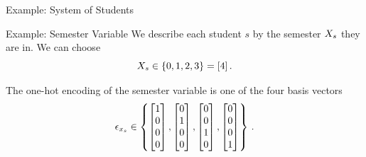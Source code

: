 \documentclass{beamer}
\begin{document}
    \begin{frame}{Example: System of Students}

        \begin{block}{Example: Semester Variable}
            We describe each student $s$ by the semester $X_{s}$ they are in.
            We can choose
            \[ X_{s} \in \{0,1,2,3\} = [4] \, . \]
        \end{block}

        The one-hot encoding of the semester variable is one of the four basis vectors
        \begin{align}
            \epsilon_{x_{s}} \in \left\{
                                                 \begin{bmatrix}
                                                     1 \\ 0 \\ 0 \\ 0
                                                 \end{bmatrix},
                                                 \begin{bmatrix}
                                                     0 \\ 1 \\ 0 \\ 0
                                                 \end{bmatrix},
                                                 \begin{bmatrix}
                                                     0 \\ 0 \\ 1 \\ 0
                                                 \end{bmatrix},
                                                 \begin{bmatrix}
                                                     0 \\ 0 \\ 0 \\ 1
                                                 \end{bmatrix}
            \right\} \, .
        \end{align}


    \end{frame}
\end{document}
